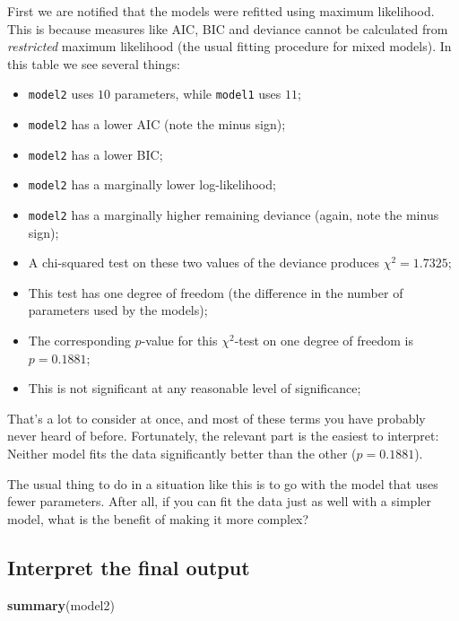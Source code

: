 \documentclass[
]{book}
\newenvironment{Shaded}{\begin{snugshade}}{\end{snugshade}}
\newcommand{\KeywordTok}[1]{\textcolor[rgb]{0.13,0.29,0.53}{\textbf{#1}}}
\newcommand{\NormalTok}[1]{#1}
\providecommand{\tightlist}{%
  \setlength{\itemsep}{0pt}\setlength{\parskip}{0pt}}
\begin{document}
First we are notified that the models were refitted using maximum likelihood. This is because measures like AIC, BIC and deviance cannot be calculated from \emph{restricted} maximum likelihood (the usual fitting procedure for mixed models). In this table we see several things:

\begin{itemize}
\tightlist
\item
  \texttt{model2} uses \(10\) parameters, while \texttt{model1} uses \(11\);
\item
  \texttt{model2} has a lower AIC (note the minus sign);
\item
  \texttt{model2} has a lower BIC;
\item
  \texttt{model2} has a marginally lower log-likelihood;
\item
  \texttt{model2} has a marginally higher remaining deviance (again, note the minus sign);
\item
  A chi-squared test on these two values of the deviance produces \(\chi^2 = 1.7325\);
\item
  This test has one degree of freedom (the difference in the number of parameters used by the models);
\item
  The corresponding \(p\)-value for this \(\chi^2\)-test on one degree of freedom is \(p = 0.1881\);
\item
  This is not significant at any reasonable level of significance;
\end{itemize}

That's a lot to consider at once, and most of these terms you have probably never heard of before. Fortunately, the relevant part is the easiest to interpret: Neither model fits the data significantly better than the other (\(p = 0.1881\)).

The usual thing to do in a situation like this is to go with the model that uses fewer parameters. After all, if you can fit the data just as well with a simpler model, what is the benefit of making it more complex?

\hypertarget{brainoutput}{%
\subsection{Interpret the final output}\label{brainoutput}}

\begin{Shaded}
\begin{Highlighting}[]
\KeywordTok{summary}\NormalTok{(model2)}
\end{Highlighting}
\end{Shaded}
\end{document}
